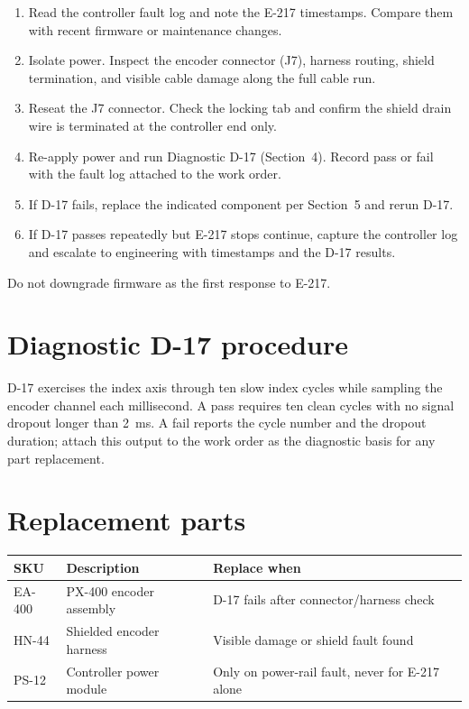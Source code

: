 \documentclass[11pt,a4paper]{article}
\begin{document}
\begin{enumerate}[leftmargin=*]
\item Read the controller fault log and note the E-217 timestamps. Compare them
with recent firmware or maintenance changes.
\item Isolate power. Inspect the encoder connector (J7), harness routing, shield
termination, and visible cable damage along the full cable run.
\item Reseat the J7 connector. Check the locking tab and confirm the shield
drain wire is terminated at the controller end only.
\item Re-apply power and run Diagnostic D-17 (Section~4). Record pass or fail
with the fault log attached to the work order.
\item If D-17 fails, replace the indicated component per Section~5 and rerun D-17.
\item If D-17 passes repeatedly but E-217 stops continue, capture the controller
log and escalate to engineering with timestamps and the D-17 results.
\end{enumerate}

Do not downgrade firmware as the first response to E-217.

\section{Diagnostic D-17 procedure}
D-17 exercises the index axis through ten slow index cycles while sampling the
encoder channel each millisecond. A pass requires ten clean cycles with no
signal dropout longer than 2~ms. A fail reports the cycle number and the dropout
duration; attach this output to the work order as the diagnostic basis for any
part replacement.

\section{Replacement parts}
\begin{table}[h]
\centering
\begin{tabular}{lll}
\toprule
SKU & Description & Replace when \\
\midrule
EA-400 & PX-400 encoder assembly & D-17 fails after connector/harness check \\
HN-44 & Shielded encoder harness & Visible damage or shield fault found \\
PS-12 & Controller power module & Only on power-rail fault, never for E-217 alone \\
\bottomrule
\end{tabular}
\end{table}
\end{document}
